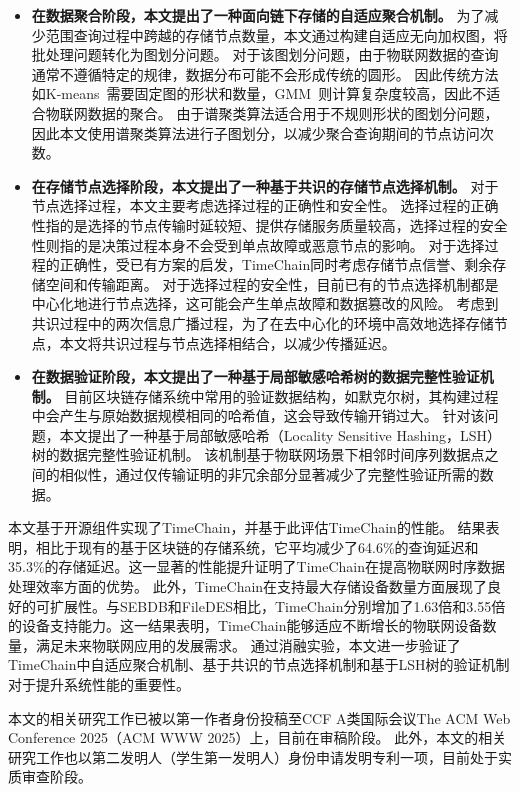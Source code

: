 \begin{itemize}
    \item \textbf{在数据聚合阶段，本文提出了一种面向链下存储的自适应聚合机制。}
    为了减少范围查询过程中跨越的存储节点数量，本文通过构建自适应无向加权图，将批处理问题转化为图划分问题。
    对于该图划分问题，由于物联网数据的查询通常不遵循特定的规律，数据分布可能不会形成传统的圆形。
    因此传统方法如K-means~\cite{kanungo2002efficient}需要固定图的形状和数量，GMM~\cite{he2010laplacian}则计算复杂度较高，因此不适合物联网数据的聚合。
    由于谱聚类算法适合用于不规则形状的图划分问题，因此本文使用谱聚类算法进行子图划分，以减少聚合查询期间的节点访问次数。

    \item \textbf{在存储节点选择阶段，本文提出了一种基于共识的存储节点选择机制。}
    对于节点选择过程，本文主要考虑选择过程的正确性和安全性。
    选择过程的正确性指的是选择的节点传输时延较短、提供存储服务质量较高，选择过程的安全性则指的是决策过程本身不会受到单点故障或恶意节点的影响。
    对于选择过程的正确性，受已有方案的启发，TimeChain同时考虑存储节点信誉、剩余存储空间和传输距离。
    对于选择过程的安全性，目前已有的节点选择机制都是中心化地进行节点选择，这可能会产生单点故障和数据篡改的风险。
    考虑到共识过程中的两次信息广播过程，为了在去中心化的环境中高效地选择存储节点，本文将共识过程与节点选择相结合，以减少传播延迟。

    \item \textbf{在数据验证阶段，本文提出了一种基于局部敏感哈希树的数据完整性验证机制。}
    目前区块链存储系统中常用的验证数据结构，如默克尔树，其构建过程中会产生与原始数据规模相同的哈希值，这会导致传输开销过大。
    针对该问题，本文提出了一种基于局部敏感哈希（Locality Sensitive Hashing，LSH）树的数据完整性验证机制。
    该机制基于物联网场景下相邻时间序列数据点之间的相似性，通过仅传输证明的非冗余部分显著减少了完整性验证所需的数据。
\end{itemize}

本文基于开源组件实现了TimeChain，并基于此评估TimeChain的性能。
结果表明，相比于现有的基于区块链的存储系统，它平均减少了64.6\%的查询延迟和35.3\%的存储延迟。这一显著的性能提升证明了TimeChain在提高物联网时序数据处理效率方面的优势。
此外，TimeChain在支持最大存储设备数量方面展现了良好的可扩展性。与SEBDB和FileDES相比，TimeChain分别增加了1.63倍和3.55倍的设备支持能力。这一结果表明，TimeChain能够适应不断增长的物联网设备数量，满足未来物联网应用的发展需求。
通过消融实验，本文进一步验证了TimeChain中自适应聚合机制、基于共识的节点选择机制和基于LSH树的验证机制对于提升系统性能的重要性。

本文的相关研究工作已被以第一作者身份投稿至CCF A类国际会议The ACM Web Conference 2025（ACM WWW 2025）上，目前在审稿阶段。
此外，本文的相关研究工作也以第二发明人（学生第一发明人）身份申请发明专利一项，目前处于实质审查阶段。

